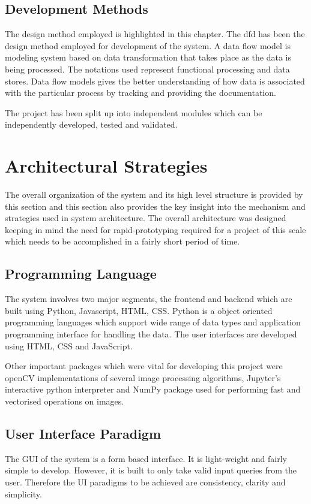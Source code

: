     \subsection{Development Methods}
    The design method employed is highlighted in this chapter. The \gls{dfd}
    has been the design method employed for development of the system. A data
    flow model is modeling system based on data transformation that takes place
    as the data is being processed. The notations used represent functional
    processing and data stores. Data flow models gives the better understanding
    of how data is associated with the particular process by tracking and
    providing the documentation.

    The project has been split up into independent modules which can be
    independently developed, tested and validated.


\section{Architectural Strategies}
The overall organization of the system and its high level structure is provided
by this section and this section also provides the key insight into the
mechanism and strategies used in system architecture. The overall architecture
was designed keeping in mind the need for rapid-prototyping required for a
project of this scale which needs to be accomplished in a fairly short period
of time.

    \subsection{Programming Language}
    The system involves two major segments, the frontend and backend which are
    built using Python, Javascript, HTML, CSS. Python is a object oriented
    programming languages which support wide range of data types and application
    programming interface for handling the data. The user interfaces are
    developed using HTML, CSS and JavaScript.

    Other important packages which were vital for developing this project were
    \gls{openCV} implementations of several image processing algorithms,
    Jupyter’s interactive python interpreter and NumPy package used for
    performing fast and vectorised operations on images.

    \subsection{User Interface Paradigm}
    The GUI of the system is a form based interface. It is light-weight and
    fairly simple to develop. However, it is built to only take valid input
    queries from the user. Therefore the UI paradigms to be achieved are
    consistency, clarity and simplicity.

